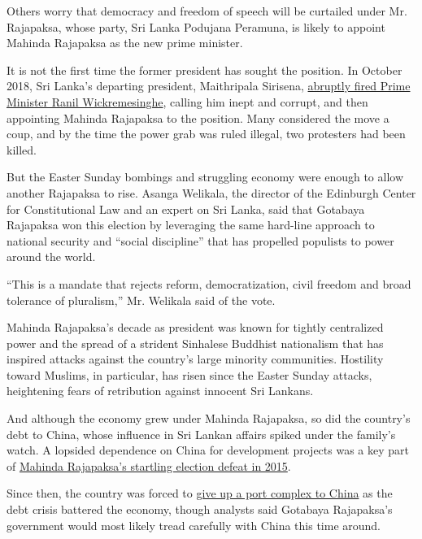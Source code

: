 Others worry that democracy and freedom of speech will be curtailed
under Mr. Rajapaksa, whose party, Sri Lanka Podujana Peramuna, is likely
to appoint Mahinda Rajapaksa as the new prime minister.

It is not the first time the former president has sought the position.
In October 2018, Sri Lanka's departing president, Maithripala Sirisena,
\href{https://www.nytimes3xbfgragh.onion/2018/10/26/world/asia/sri-lanka-political-crisis.html?module=inline}{abruptly
fired Prime Minister Ranil Wickremesinghe}, calling him inept and
corrupt, and then appointing Mahinda Rajapaksa to the position. Many
considered the move a coup, and by the time the power grab was ruled
illegal, two protesters had been killed.

But the Easter Sunday bombings and struggling economy were enough to
allow another Rajapaksa to rise. Asanga Welikala, the director of the
Edinburgh Center for Constitutional Law and an expert on Sri Lanka, said
that Gotabaya Rajapaksa won this election by leveraging the same
hard-line approach to national security and ``social discipline'' that
has propelled populists to power around the world.

``This is a mandate that rejects reform, democratization, civil freedom
and broad tolerance of pluralism,'' Mr. Welikala said of the vote.

Mahinda Rajapaksa's decade as president was known for tightly
centralized power and the spread of a strident Sinhalese Buddhist
nationalism that has inspired attacks against the country's large
minority communities. Hostility toward Muslims, in particular, has risen
since the Easter Sunday attacks, heightening fears of retribution
against innocent Sri Lankans.

And although the economy grew under Mahinda Rajapaksa, so did the
country's debt to China, whose influence in Sri Lankan affairs spiked
under the family's watch. A lopsided dependence on China for development
projects was a key part of
\href{https://www.nytimes3xbfgragh.onion/2015/01/09/world/asia/sri-lanka-election-president-mahinda-rajapaksa.html?module=inline}{Mahinda
Rajapaksa's startling election defeat in 2015}.

Since then, the country was forced to
\href{https://www.nytimes3xbfgragh.onion/2018/06/25/world/asia/china-sri-lanka-port.html?module=inline}{give
up a port complex to China} as the debt crisis battered the economy,
though analysts said Gotabaya Rajapaksa's government would most likely
tread carefully with China this time around.

